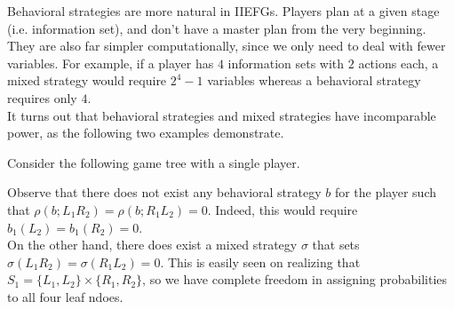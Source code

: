 	Behavioral strategies are more natural in IIEFGs. Players plan at a given stage (i.e. information set), and don't have a master plan from the very beginning. They are also far simpler computationally, since we only need to deal with fewer variables. For example, if a player has $4$ information sets with $2$ actions each, a mixed strategy would require $2^4-1$ variables whereas a behavioral strategy requires only $4$.\\
	It turns out that behavioral strategies and mixed strategies have incomparable power, as the following two examples demonstrate. 

	\begin{fex}
		\label{mixed without equiv behavioral}
		Consider the following game tree with a single player.
		\begin{center}
		\end{center}
		Observe that there does not exist any behavioral strategy $b$ for the player such that $\rho(b;L_1R_2) = \rho(b;R_1L_2) = 0$. Indeed, this would require $b_1(L_2) = b_1(R_2) = 0$.\\
		On the other hand, there does exist a mixed strategy $\sigma$ that sets $\sigma(L_1R_2) = \sigma(R_1L_2) = 0$. This is easily seen on realizing that $S_1 = \{L_1,L_2\} \times \{R_1,R_2\}$, so we have complete freedom in assigning probabilities to all four leaf ndoes.
	\end{fex}


